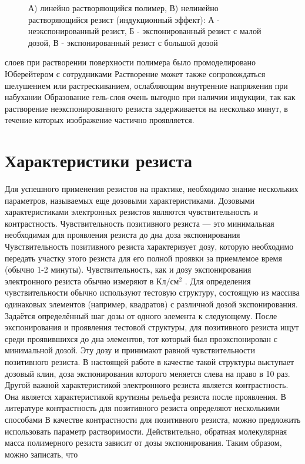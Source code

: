 \begin{figure}[H]
\center
\caption{А) линейно растворяющийся полимер, В) нелинейно растворяющийся резист (индукционный эффект): А - неэкспонированный резист, Б - экспонированный резист с малой дозой, В - экспонированный резист с большой дозой}
\label{fig:6}
\end{figure}

слоев при растворении поверхности полимера было промоделировано Юберейтером с сотрудниками Растворение может также сопровождаться шелушением или растрескиванием, ослабляющим внутренние напряжения при набухании Образование гель-слоя очень выгодно при наличии индукции, так как растворение неэкспонированного резиста задерживается на несколько минут, в течение которых изображение частично проявляется.

\section{Характеристики резиста}

Для успешного применения резистов на практике, необходимо знание нескольких параметров, называемых еще дозовыми характеристиками. Дозовыми характеристиками электронных резистов являются чувствительность и контрастность. Чувствительность позитивного резиста — это минимальная необходимая для проявления резиста до дна доза экспонирования Чувствительность позитивного резиста характеризует дозу, которую необходимо передать участку этого резиста для его полной проявки за приемлемое время (обычно 1-2 минуты). Чувствительность, как и дозу экспонирования электронного резиста обычно измеряют в $\text{Кл}/\text{см}^2$ . Для
определения чувствительности обычно используют тестовую структуру, состоящую из массива одинаковых элементов (например, квадратов) с
различной дозой экспонирования. Задаётся определённый шаг дозы от одного элемента к следующему. После экспонирования и проявления тестовой структуры, для позитивного резиста ищут среди проявившихся до дна элементов, тот который был проэкспонирован с минимальной дозой. Эту дозу и принимают равной чувствительности позитивного резиста. В настоящей работе в качестве такой структуры выступает дозовый клин, доза экспонирования которого меняется слева на право в 10 раз.
Другой важной характеристикой электронного резиста является контрастность. Она является характеристикой крутизны рельефа резиста после проявления. В литературе контрастность для позитивного резиста определяют несколькими способами	В качестве контрастности для
позитивного резиста, можно предложить использовать параметр растворимости. Действительно, обратная молекулярная масса полимерного резиста зависит от дозы экспонирования. 
Таким образом, можно записать, что


